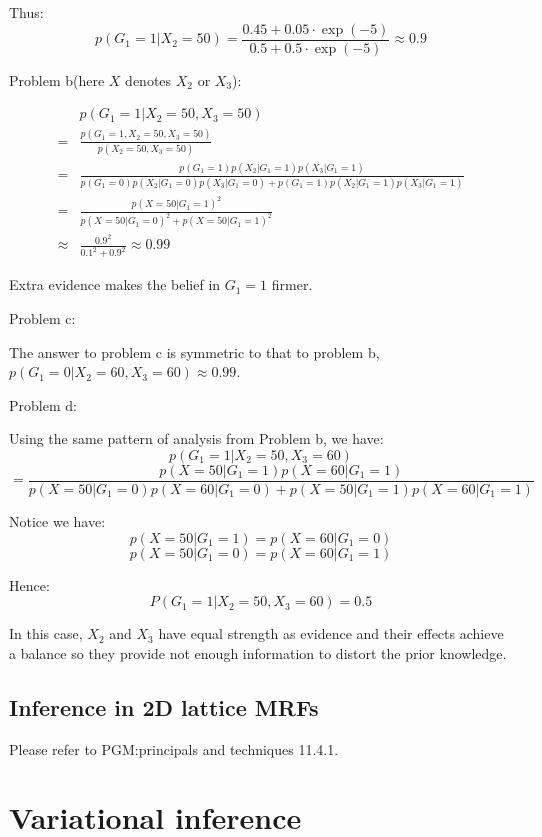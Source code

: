 \documentclass[UTF8]{ctexart}
\begin{document}
Thus:
$$p(G_{1}=1|X_{2}=50)=\frac{0.45+0.05\cdot \exp(-5)}{0.5 + 0.5 \cdot \exp(-5)}\approx 0.9$$

Problem b(here $X$ denotes $X_{2}$ or $X_{3}$):

\begin{align}
\ &p(G_{1}=1|X_{2}=50,X_{3}=50)\nonumber \\
 = &\frac{p(G_{1}=1,X_{2}=50,X_{3}=50)}{p(X_{2}=50,X_{3}=50)}\nonumber \\
=&\frac{p(G_{1}=1)p(X_{2}|G_{1}=1)p(X_{3}|G_{1}=1)}{p(G_{1}=0)p(X_{2}|G_{1}=0)p(X_{3}|G_{1}=0)+p(G_{1}=1)p(X_{2}|G_{1}=1)p(X_{3}|G_{1}=1)}\nonumber \\
=&\frac{p(X=50|G_{1}=1)^{2}}{p(X=50|G_{1}=0)^{2}+p(X=50|G_{1}=1)^{2}} \nonumber \\
\approx& \frac{0.9^{2}}{0.1^{2}+0.9^{2}} \approx 0.99 \nonumber
\end{align}

Extra evidence makes the belief in $G_{1}=1$ firmer.

Problem c:

The answer to problem c is symmetric to that to problem b, $p(G_{1}=0|X_{2}=60, X_{3}=60) \approx 0.99$.

Problem d:

Using the same pattern of analysis from Problem b, we have:
$$p(G_{1}=1|X_{2}=50, X_{3}=60)$$
$$=\frac{p(X=50|G_{1}=1)p(X=60|G_{1}=1)}{p(X=50|G_{1}=0)p(X=60|G_{1}=0)+p(X=50|G_{1}=1)p(X=60|G_{1}=1)}$$

Notice we have:
$$p(X=50|G_{1}=1)=p(X=60|G_{1}=0)$$
$$p(X=50|G_{1}=0)=p(X=60|G_{1}=1)$$

Hence:
$$P(G_{1}=1|X_{2}=50,X_{3}=60)=0.5$$

In this case, $X_{2}$ and $X_{3}$ have equal strength as evidence and their effects achieve a balance so they provide not enough information to distort the prior knowledge.

\subsection{Inference in 2D lattice MRFs}
Please refer to PGM:principals and techniques 11.4.1.


\newpage
\section{Variational inference}
\end{document}
